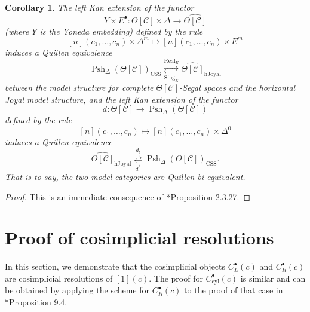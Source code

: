 \documentclass{amsart}
\numberwithin{equation}{section}
\theoremstyle{plain}   %
\newtheorem{cor}[subsection]{Corollary}
\theoremstyle{remark}
\theoremstyle{plain}
\DeclareMathOperator{\Psh}{Psh}
\newcommand{\C}{\ensuremath{\mathcal{C}}}
\newcommand{\cellset}{\ensuremath{\widehat{\Theta[\mathcal{C}]}}}
\begin{document}
\begin{cor}
	The left Kan extension of the functor \[Y \times E^\bullet:\Theta[\C]\times \Delta \to \cellset\] (where \(Y\) is the Yoneda embedding) defined by the rule 
	\[[n](c_1,\dots,c_n)\times \Delta^m \mapsto [n](c_1,\dots,c_n) \times E^m\]
	induces a Quillen equivalence
	\[\Psh_\Delta(\Theta[\C])_{\mathrm{CSS}} \underset{\operatorname{Sing}_E}{\overset{\operatorname{Real}_E}{\rightleftarrows}} \cellset_{\mathrm{hJoyal}}\]
	between the model structure for complete \(\Theta[\C]\)-Segal spaces and the horizontal Joyal model structure,
	and the left Kan extension of the functor 
	\[d:\Theta[\C] \to \Psh_\Delta(\Theta[\C])\]
	defined by the rule
	\[[n](c_1,\dots,c_n) \mapsto [n](c_1,\dots,c_n) \times \Delta^0\]
	induces a Quillen equivalence
	\[\cellset_{\mathrm{hJoyal}} \underset{d^\ast}{\overset{d_!}{\rightleftarrows}} \Psh_\Delta(\Theta[\C])_{\mathrm{CSS}}.\]
	That is to say, the two model categories are Quillen bi-equivalent.
\end{cor}
\begin{proof} This is an immediate consequence of \cite{cisinski-book}*{Proposition 2.3.27}.
\end{proof}

\section{Proof of cosimplicial resolutions}\label{cosimplicial}
In this section, we demonstrate that the cosimplicial objects \(C^\bullet_L(c)\) and \(C^\bullet_R(c)\) are cosimplicial resolutions of \([1](c)\). The proof for \(C^\bullet_{\mathrm{cyl}}(c)\) is similar and can be obtained by applying the scheme for \(C^\bullet_R(c)\) to the proof of that case in \cite{ds2}*{Proposition 9.4}.
\end{document}

